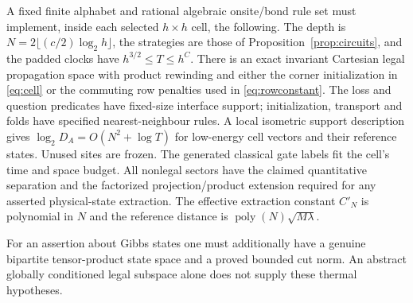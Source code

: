 \begin{definition}\label{def:layout}
A fixed finite alphabet and rational algebraic onsite/bond rule set
must implement, inside each selected $h\times h$ cell, the following.
The depth is $N=2\lfloor(c/2)\log_2h\rfloor$, the strategies are those
of Proposition~\ref{prop:circuits}, and the padded clocks have
$h^{3/2}\leq T\leq h^C$. There is an exact invariant Cartesian legal
propagation space with product rewinding and either the corner
initialization in \eqref{eq:cell} or the commuting row penalties used
in \eqref{eq:rowconstant}. The loss and question predicates have
fixed-size interface support; initialization, transport and folds have
specified nearest-neighbour rules. A local isometric support description
gives $\log_2D_A=O(N^2+\log T)$ for low-energy cell vectors and
their reference states. Unused sites are frozen. The generated
classical gate labels fit the cell's time and space budget. All
nonlegal sectors have the claimed quantitative separation and the
factorized projection/product extension required for any asserted
physical-state extraction. The effective extraction constant $C'_N$
is polynomial in $N$ and the reference distance is
$\operatorname{poly}(N)\sqrt{M\lambda}$.
\end{definition}

For an assertion about Gibbs states one must additionally have a genuine
bipartite tensor-product state space and a proved bounded cut norm.
An abstract globally conditioned legal subspace alone does not supply
these thermal hypotheses.

